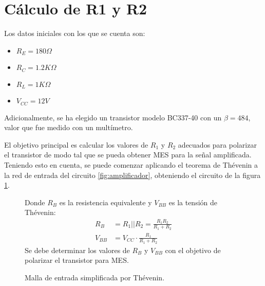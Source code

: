 \section{Cálculo de R1 y R2} \label{section:calc_r1_r2}
Los datos iniciales con los que se cuenta son:
\begin{itemize}
    \item $R_E = 180\Omega$
    \item $R_C = 1.2K\Omega$
    \item $R_L = 1K\Omega$
    \item $V_{CC} = 12V$
\end{itemize}
Adicionalmente, se ha elegido un transistor modelo BC337-40 con un $\beta = 484$, valor que fue medido con un
multímetro.

El objetivo principal es calcular los valores de $R_1$ y $R_2$ adecuados para polarizar el transistor de modo tal que
se pueda obtener MES para la señal amplificada. Teniendo esto en cuenta, se puede comenzar aplicando el teorema de
Thévenin a la red de entrada del circuito \ref{fig:amplificador}, obteniendo el circuito de la figura
\ref{fig:malla-entrada}.

\begin{figure}[H]
    \centering
    \begin{minipage}{0.4\textwidth}
        \centering
        \caption{Malla de entrada simplificada por Thévenin.}
        \label{fig:malla-entrada}
    \end{minipage}%
    \begin{minipage}{0.4\textwidth}
        \centering
        Donde $R_{B}$ es la resistencia equivalente y $V_{BB}$ es la tensión de Thévenin:
        \begin{align}
            R_{B} &= R_1||R_2=\frac{R_1 R_2}{R_1 + R_2} \label{ec:thevenin-rb}\\[6pt]
            V_{BB} &= V_{CC} \cdot \frac{R_1}{R_1 + R_2} \label{ec:thevenin-vbb}
        \end{align}
        Se debe determinar los valores de $R_B$ y $V_{BB}$ con el objetivo de polarizar
        el transistor para MES.
    \end{minipage}
\end{figure}

